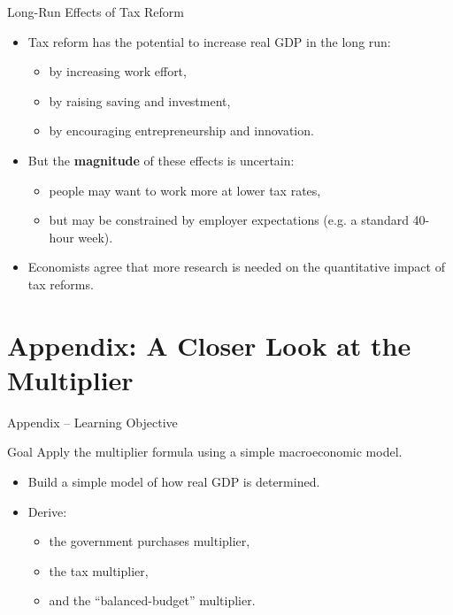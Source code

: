 \documentclass[aspectratio=169]{beamer}
\begin{document}
\begin{frame}{Long-Run Effects of Tax Reform}
\transfade
\begin{itemize}[<+->]
  \item Tax reform has the potential to increase real GDP in the long run:
  \begin{itemize}[<+->]
    \item by increasing work effort,
    \item by raising saving and investment,
    \item by encouraging entrepreneurship and innovation.
  \end{itemize}
  \item But the \textbf{magnitude} of these effects is uncertain:
  \begin{itemize}[<+->]
    \item people may want to work more at lower tax rates,
    \item but may be constrained by employer expectations (e.g. a standard 40-hour week).
  \end{itemize}
  \item Economists agree that more research is needed on the quantitative impact of tax reforms.
\end{itemize}
\end{frame}

\section*{Appendix: A Closer Look at the Multiplier}

\begin{frame}{Appendix -- Learning Objective}
\transfade
\begin{block}{Goal}
Apply the multiplier formula using a simple macroeconomic model.
\end{block}
\begin{itemize}[<+->]
  \item Build a simple model of how real GDP is determined.
  \item Derive:
  \begin{itemize}[<+->]
    \item the government purchases multiplier,
    \item the tax multiplier,
    \item and the “balanced-budget” multiplier.
  \end{itemize}
\end{itemize}
\end{frame}
\end{document}
